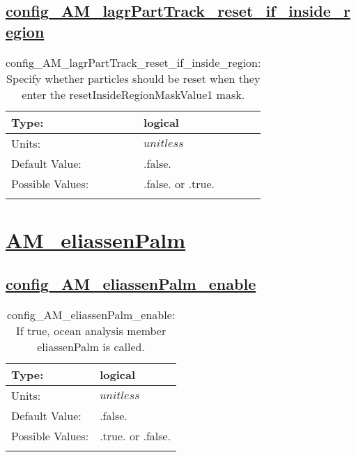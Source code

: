 \subsection[config\_AM\_lagrPartTrack\_reset\_if\_inside\_region]{\hyperref[sec:nm_tab_AM_lagrPartTrack]{config\_AM\_lagrPartTrack\_reset\_if\_inside\_region}}
\label{subsec:nm_sec_config_AM_lagrPartTrack_reset_if_inside_region}
\begin{center}
\begin{longtable}{| p{2.0in} || p{4.0in} |}
    \hline
    Type: & logical \\
    \hline
    Units: & $unitless$ \\
    \hline
    Default Value: & .false. \\
    \hline
    Possible Values: & .false. or .true. \\
    \hline
    \caption{config\_AM\_lagrPartTrack\_reset\_if\_inside\_region: Specify whether particles should be reset when they enter the resetInsideRegionMaskValue1 mask.}
\end{longtable}
\end{center}
\section[AM\_eliassenPalm]{\hyperref[sec:nm_tab_AM_eliassenPalm]{AM\_eliassenPalm}}
\label{sec:nm_sec_AM_eliassenPalm}
\subsection[config\_AM\_eliassenPalm\_enable]{\hyperref[sec:nm_tab_AM_eliassenPalm]{config\_AM\_eliassenPalm\_enable}}
\label{subsec:nm_sec_config_AM_eliassenPalm_enable}
\begin{center}
\begin{longtable}{| p{2.0in} || p{4.0in} |}
    \hline
    Type: & logical \\
    \hline
    Units: & $unitless$ \\
    \hline
    Default Value: & .false. \\
    \hline
    Possible Values: & .true. or .false. \\
    \hline
    \caption{config\_AM\_eliassenPalm\_enable: If true, ocean analysis member eliassenPalm is called.}
\end{longtable}
\end{center}
